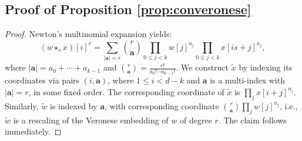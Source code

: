 \documentclass[twoside]{article}
\theoremstyle{plain}%
\theoremstyle{definition}
\theoremstyle{remark}
\newcommand{\conv}[1]{\star_{#1}}
\begin{document}
\subsection{Proof of Proposition \ref{prop:converonese}}\label{app:converonese}
\begin{proof} 
 Newton's multinomial expansion yields: 
  \begin{equation*}\label{eq:newtexp}
      \displaystyle (w \conv{s} x)[i]^r = \sum_{|\mathbf{a}| = r}\binom{r}{\mathbf{a}} \prod_{0 \leq j < k} w[j]^{a_j} \prod_{0 \leq j < k}x[is + j]^{a_j},
\end{equation*}
where $|\mathbf{a}| = a_0 + \cdots + a_{k-1}$ and $\binom{r}{\mathbf{a}} = \frac{r!}{a_0! \cdots a_{k-1}!}$. We construct $\widetilde{x}$ by indexing its coordinates via pairs $(i, \mathbf{a})$, where $1 \leq i < d - k$ and $\mathbf{a}$ is a multi-index with $|\mathbf{a}| = r$, in some fixed order. The corresponding coordinate of $\tilde{x}$ is $\prod_j x[i +j]^{a_j}$. Similarly, $\tilde{w}$ is indexed by $\mathbf{a}$, with corresponding coordinate $\binom{r}{\mathbf{a}}\prod_j w[j]^{a_j}$, i.e., $\tilde{w}$ is a rescaling of the Veronese embedding of $w$ of degree $r$. The claim follows immediately. 
\end{proof}
\end{document}
